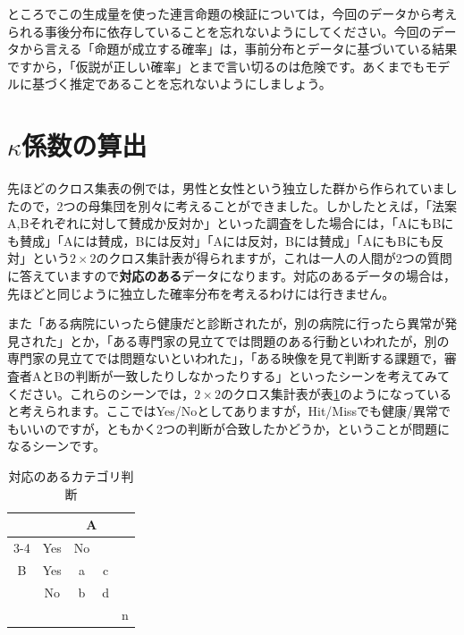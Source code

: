 \documentclass{ltjsbook}
\begin{document}
ところでこの生成量を使った連言命題の検証については，今回のデータから考えられる事後分布に依存していることを忘れないようにしてください。今回のデータから言える「命題が成立する確率」は，事前分布とデータに基づいている結果ですから，「仮説が正しい確率」とまで言い切るのは危険です。あくまでもモデルに基づく推定であることを忘れないようにしましょう。
\section{$\kappa$係数の算出}
先ほどのクロス集表の例では，男性と女性という独立した群から作られていましたので，2つの母集団を別々に考えることができました。しかしたとえば，「法案A,Bそれぞれに対して賛成か反対か」といった調査をした場合には，「AにもBにも賛成」「Aには賛成，Bには反対」「Aには反対，Bには賛成」「AにもBにも反対」という$2\times 2$のクロス集計表が得られますが，これは一人の人間が2つの質問に答えていますので\textbf{対応のある}データになります。対応のあるデータの場合は，先ほどと同じように独立した確率分布を考えるわけには行きません。

また「ある病院にいったら健康だと診断されたが，別の病院に行ったら異常が発見された」とか，「ある専門家の見立てでは問題のある行動といわれたが，別の専門家の見立てでは問題ないといわれた」，「ある映像を見て判断する課題で，審査者AとBの判断が一致したりしなかったりする」といったシーンを考えてみてください。これらのシーンでは，$2\times2$のクロス集計表が表\ref{tbl:23_03}のようになっていると考えられます。ここではYes/Noとしてありますが，Hit/Missでも健康/異常でもいいのですが，ともかく2つの判断が合致したかどうか，ということが問題になるシーンです。

\begin{table}[ht]
    \centering
    \caption{対応のあるカテゴリ判断}
    \begin{tabular}{c|c|cc|c}
        \multicolumn{2}{c|}{} & \multicolumn{2}{c|}{A}\\
        \cline{3-4}
        \multicolumn{2}{c|}{}
                  & Yes & No & \\ \hline
            B & Yes & a & c & \\
              &  No & b & d & \\ \hline
              &     &   &   & n \\ 
        \end{tabular}
    \label{tbl:23_03}
\end{table}
\end{document}

